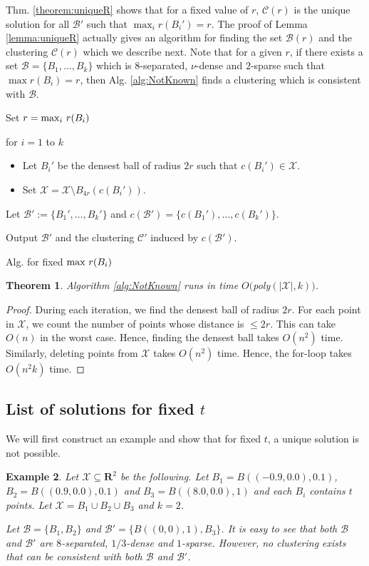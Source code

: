\documentclass[twoside]{article}
\newcommand{\mc}{\mathcal}
\newtheorem{theorem}{Theorem}
\newtheorem{example}[theorem]{Example}
\newenvironment{alg}{
    \begin{list}{}{
        \setlength{\itemsep}{2pt}
        \setlength{\parsep}{0pt}
        \setlength{\parskip}{0pt}
        \setlength{\topsep}{1pt}
    }
}
{
    \end{list}
}
\begin{document}
Thm. \ref{theorem:uniqueR} shows that for a fixed value of $r$, $\mc C(r)$ is the unique solution for all $\mc B'$ such that $\max_i r(B_i') = r$. The proof of Lemma \ref{lemma:uniqueR} actually gives an algorithm for finding the set $\mc B(r)$ and the clustering $\mc C(r)$ which we describe next. Note that for a given $r$, if there exists a set $\mc B = \{B_1,\ldots,B_k\}$ which is $8$-separated, $\nu$-dense and $2$-sparse such that $\max r(B_i) = r$, then Alg. \ref{alg:NotKnown} finds a clustering which is consistent with $\mc B$.

\begin{algorithm}
\begin{alg}
\item[] Set $r = \max_i \thinspace r(B_i)$
\item[] for $i=1$ to $k$
	\begin{itemize}
		\item[] Let $B_i'$ be the densest ball of radius $2r$ such that $c(B_i') \in \mathcal{X}$.
		\item[] Set $\mc X=\mc X\setminus B_{4r}(c(B_i'))$. 
	\end{itemize}
\item[] Let $\mc B' := \{B_1',\ldots,B_k'\}$ and $c(\mc B') = \{c(B_1'),\ldots,c(B_k')\}$.
\item[] Output $\mc B'$ and the clustering $\mc C'$ induced by $c(\mc B')$.
\label{alg:NotKnown}
\end{alg}
\caption{Alg. for fixed $\max \thinspace r(B_i)$}
\end{algorithm}

\begin{theorem}
Algorithm \ref{alg:NotKnown} runs in time $O($poly$(|\mathcal{X}|,k))$.
\end{theorem}
\begin{proof}
During each iteration, we find the densest ball of radius $2r$. For each point in $\mathcal{X}$, we count the number of points whose distance is $\le 2r$. This can take $O(n)$ in the worst case. Hence, finding the densest ball takes $O(n^2)$ time. Similarly, deleting points from $\mathcal{X}$ takes $O(n^2)$ time. Hence, the for-loop takes $O(n^2k)$ time.
\end{proof}

\subsection{List of solutions for fixed $t$}
We will first construct an example and show that for fixed $t$, a unique solution is not possible.
\begin{example}
\label{example:notuniqueT}
Let $\mc X \subseteq \mathbf{R}^2$ be the following. Let $B_1 = B((-0.9, 0.0), 0.1)$, $B_2 = B((0.9, 0.0), 0.1)$ and $B_3 = B((8.0, 0.0), 1)$ and each $B_i$ contains $t$ points. Let $\mc X = B_1 \cup B_2 \cup B_3$ and $k = 2$.

Let $\mc B = \{B_1, B_2\}$ and $\mc B' = \{B((0,0), 1), B_3\}$. It is easy to see that both $\mc B$ and $\mc B'$ are $8$-separated, $1/3$-dense and $1$-sparse. However, no clustering exists that can be consistent with both $\mc B$ and $\mc B'$.
\end{example}
\end{document}
